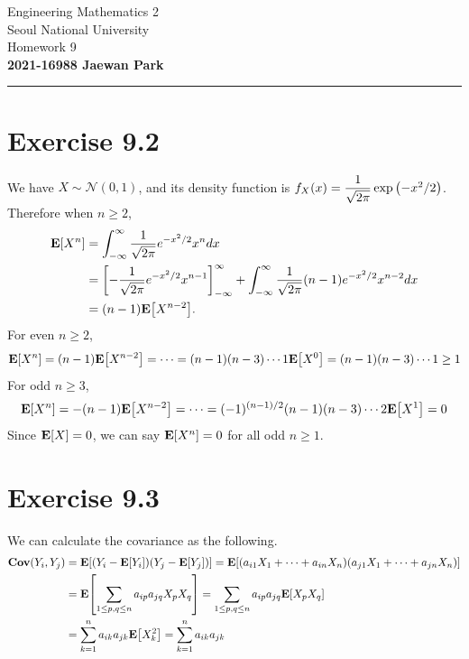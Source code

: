 \documentclass{article}
\begin{document}
\vspace*{-1.5cm}
{\centering \vbox{%
\vspace{2mm}
\large
Engineering Mathematics 2 \hfill
\\
Seoul National University
\\[4mm]
Homework 9 \\
\textbf{2021-16988 Jaewan Park} \\[0.8mm]
}}
\par\noindent\rule{\textwidth}{0.5pt}


\section*{Exercise 9.2} 
We have $X \sim \mathcal{N}(0, 1)$, and its density function is $f_X(x) = \dfrac{1}{\sqrt{2\pi}}\exp\qty(-x^2/2)$.
Therefore when $n \geq 2$,
\begin{align*}
    \mathbf{E}\qty[X^n] &= \int_{-\infty}^{\infty}\frac{1}{\sqrt{2\pi}}e^{-x^2/2}x^ndx \\
    &= \qty[-\frac{1}{\sqrt{2\pi}}e^{-x^2/2}x^{n-1}]_{-\infty}^{\infty} + \int_{-\infty}^{\infty}\frac{1}{\sqrt{2\pi}}(n-1)e^{-x^2/2}x^{n-2}dx \\
    &= (n-1)\mathbf{E}\qty[X^{n-2}].
\end{align*}
For even $n \geq 2$, 
\begin{align*}
    \mathbf{E}\qty[X^n] = (n-1)\mathbf{E}\qty[X^{n-2}] = \cdots = (n-1)(n-3)\cdots{1}\mathbf{E}\qty[X^0] = (n-1)(n-3)\cdots{1} \geq 1
\end{align*}
For odd $n \geq 3$, 
\begin{align*}
    \mathbf{E}\qty[X^n] = -(n-1)\mathbf{E}\qty[X^{n-2}] = \cdots = (-1)^{(n-1)/2}(n-1)(n-3)\cdots{2}\mathbf{E}\qty[X^1] = 0
\end{align*}
Since $\mathbf{E}\qty[X] = 0$, we can say $\mathbf{E}\qty[X^n] = 0$ for all odd $n \geq 1$.

\section*{Exercise 9.3}
We can calculate the covariance as the following.
\begin{align*}
    \mathbf{Cov}\qty(Y_i, Y_j) &= \mathbf{E}\qty[\qty(Y_i - \mathbf{E}\qty[Y_i])\qty(Y_j - \mathbf{E}\qty[Y_j])] = \mathbf{E}\qty[\qty(a_{i1}X_1 + \cdots + a_{in}X_n)\qty(a_{j1}X_1 + \cdots + a_{jn}X_n)] \\
    &= \mathbf{E}\qty[\sum_{1 \leq p, q \leq n}a_{ip}a_{jq}X_pX_q] = \sum_{1 \leq p, q \leq n}a_{ip}a_{jq}\mathbf{E}\qty[X_pX_q] \\
    &= \sum_{k=1}^{n}a_{ik}a_{jk}\mathbf{E}\qty[X_k^2] = \sum_{k=1}^{n}a_{ik}a_{jk}
\end{align*}
\end{document}

